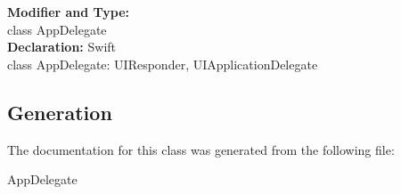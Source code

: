 \textbf{Modifier and Type:}\\
\tab class AppDelegate\\


\textbf{Declaration:}
\tab 
Swift\\

class AppDelegate: UIResponder, UIApplicationDelegate\\


\subsection{Generation}
The documentation for this class was generated from the following file\-:
\begin{DoxyCompactItemize}
\item AppDelegate
\end{DoxyCompactItemize} 









